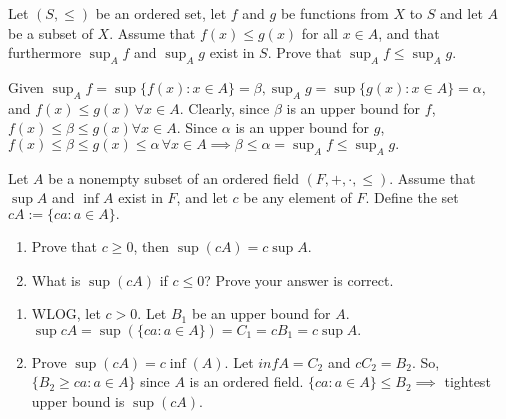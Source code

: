 \documentclass[12pt,letterpaper,boxed]{hmcpset}
\begin{document}
\begin{problem}[Exercise 1.7.]
Let $(S,\leq)$ be an ordered set, let $f$ and $g$ be functions from $X$ to $S$ and let $A$ be a subset of $X$. Assume that $f(x)\leq g(x)$ for all $x \in A$, and that furthermore $\sup_A f$ and $\sup_A g$ exist in $S$. Prove that $\sup_A f \leq \sup_A g.$
 \end{problem}

\begin{solution}
Given $\sup_{A}f=\sup\{f(x) : x \in A\}=\beta, \sup_{A}g=\sup\{g(x) : x \in A\}=\alpha,$ and $f(x) \leq g(x)\, \forall x \in A$. Clearly, since $\beta$ is an upper bound for $f$, $f(x)\leq \beta \leq g(x) \forall x\in A.$ Since $\alpha$ is an upper bound for $g$, $f(x)\leq \beta \leq g(x) \leq \alpha\, \forall x\in A \implies \beta \leq \alpha = \sup_A f \leq \sup_A g. $ 
\end{solution}

\begin{problem}[Exercise 2.3.]
Let $A$ be a nonempty subset of an ordered field $(F,+,\cdot,\leq)$. Assume that $\sup A$ and $\inf A$ exist in $F$, and let $c$ be any element of $F$. Define the set $cA := \{ ca : a \in A\}.$

\vspace{-2mm}
\begin{enumerate}
	\itemsep0em
	\item Prove that $ c \ge 0$, then $\sup(cA) = c\sup A.$ 
	\item What is $\sup(cA)$ if $c \le 0$? Prove your answer is correct.
\end{enumerate}

\end{problem}

\begin{solution}
\vspace{-2mm}
\begin{enumerate}
	\itemsep0em
	\item WLOG, let $c > 0.$ Let $B_1$ be an upper bound for $A$. $\sup cA = \sup(\{ ca : a \in A\})=C_1=cB_1=c\sup A.$
	\item Prove $\sup(cA) = c\inf(A).$ Let $inf A = C_2$ and $cC_2=B_2$. So, $\{ B_2 \ge ca : a \in A\}$ since $A$ is an ordered field. $\{ ca : a\in A \}\leq B_2 \implies$ tightest upper bound is $\sup(cA).$   
\end{enumerate}
\end{solution}
\end{document}
